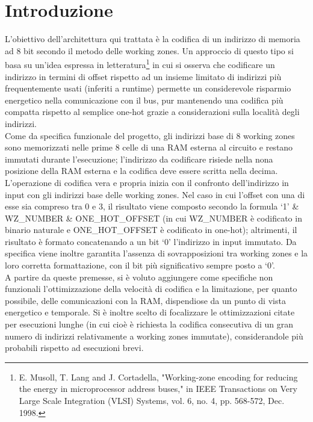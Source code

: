 \documentclass[10pt,english, openany]{book}
\begin{document}
\chapter{Introduzione}\label{chapt:sum}


L’obiettivo dell’architettura qui trattata è la codifica di un indirizzo di memoria ad 8 bit secondo il metodo delle working zones. Un approccio di questo tipo si basa su un’idea espressa in letteratura\footnote{\label{paper_citation}E. Musoll, T. Lang and J. Cortadella, "Working-zone encoding for reducing the energy in microprocessor address buses," in IEEE Transactions on Very Large Scale Integration (VLSI) Systems, vol. 6, no. 4, pp. 568-572, Dec. 1998.} in cui si osserva che codificare un indirizzo in termini di offset rispetto ad un insieme limitato di indirizzi più frequentemente usati (inferiti a runtime) permette un considerevole risparmio energetico nella comunicazione con il bus, pur mantenendo una codifica più compatta rispetto al semplice one-hot grazie a considerazioni sulla località degli indirizzi.\\
Come da specifica funzionale del progetto, gli indirizzi base di 8 working zones sono memorizzati nelle prime 8 celle di una RAM esterna al circuito e restano immutati durante l’esecuzione; l’indirizzo da codificare risiede nella nona posizione della RAM esterna e la codifica deve essere scritta nella decima. L’operazione di codifica vera e propria inizia con il confronto dell’indirizzo in input con gli indirizzi base delle working zones. Nel caso in cui l’offset con una di esse sia compreso tra 0 e 3, il risultato viene composto secondo la formula ‘1’ \& WZ\_NUMBER \& ONE\_HOT\_OFFSET (in cui WZ\_NUMBER è codificato in binario naturale e ONE\_HOT\_OFFSET è codificato in one-hot); altrimenti, il risultato è formato concatenando a un bit ‘0’ l’indirizzo in input immutato. Da specifica viene inoltre garantita l’assenza di sovrapposizioni tra working zones e la loro corretta formattazione, con il bit più significativo sempre posto a ‘0’.\\
A partire da queste premesse, si è voluto aggiungere come specifiche non funzionali l’ottimizzazione della velocità di codifica e la limitazione, per quanto possibile, delle comunicazioni con la RAM, dispendiose da un punto di vista energetico e temporale. Si è inoltre scelto di focalizzare le ottimizzazioni citate per esecuzioni lunghe (in cui cioè è richiesta la codifica consecutiva di un gran numero di indirizzi relativamente a working zones immutate), considerandole più probabili rispetto ad esecuzioni brevi.
\end{document}
